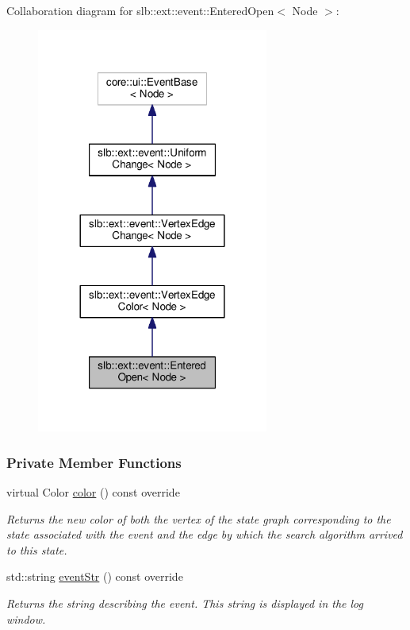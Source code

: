 Collaboration diagram for slb\+:\+:ext\+:\+:event\+:\+:Entered\+Open$<$ Node $>$\+:\nopagebreak
\begin{figure}[H]
\begin{center}
\leavevmode
\includegraphics[width=216pt]{structslb_1_1ext_1_1event_1_1EnteredOpen__coll__graph}
\end{center}
\end{figure}
\subsubsection*{Private Member Functions}
\begin{DoxyCompactItemize}
\item 
virtual Color \hyperlink{structslb_1_1ext_1_1event_1_1EnteredOpen_ae9d3efea90ef2050c58f5744ade0d645}{color} () const override
\begin{DoxyCompactList}\small\item\em Returns the new color of both the vertex of the state graph corresponding to the state associated with the event and the edge by which the search algorithm arrived to this state. \end{DoxyCompactList}\item 
std\+::string \hyperlink{structslb_1_1ext_1_1event_1_1EnteredOpen_acd82f78256006e52aa541106c6a0c31f}{event\+Str} () const override
\begin{DoxyCompactList}\small\item\em Returns the string describing the event. This string is displayed in the log window. \end{DoxyCompactList}\end{DoxyCompactItemize}
